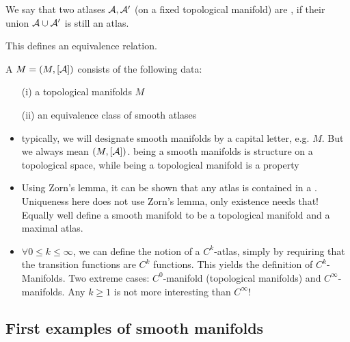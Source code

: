 \begin{definition*}
    We say that two atlases \(\mathcal{A},\mathcal{A}'\) (on a fixed topological manifold) are , if their union 
    \(\mathcal{A}\cup\mathcal{A}'\) is still an atlas.
\end{definition*}

This defines an equivalence relation.

\begin{definition*}
    A  \(M=(M,[\mathcal{A}])\) consists of the following data:
    \begin{enumerate}
        \item[(i)] a topological manifolds \(M\)
        \item[(ii)] an equivalence class of smooth atlases 
    \end{enumerate}
\end{definition*}


\begin{remark}
    \begin{itemize}
        \item typically, we will designate smooth manifolds by a capital letter, e.g. \(M\). But we always mean \((M,[\mathcal{A}])\).
               being a smooth manifolds is  structure on a topological space, while being a topological manifold is a property
        \item Using Zorn's lemma, it can be shown that any atlas is contained in a . Uniqueness here does not use Zorn's lemma, only existence needs that! Equally well define a smooth manifold to 
              be a topological manifold and a maximal atlas.
        \item \(\forall 0\leq k\leq \infty\), we can define the notion of a \(C^k\)-atlas, simply by requiring that the transition functions are 
              \(C^k\) functions. This yields the definition of \(C^k\)-Manifolds. Two extreme cases: \(C^0\)-manifold (topological manifolds) and \(C^\infty\)-manifolds. Any \(k\geq 1\) is not more interesting than \(C^\infty\)!
    \end{itemize}
\end{remark}


\subsection{First examples of smooth manifolds}

